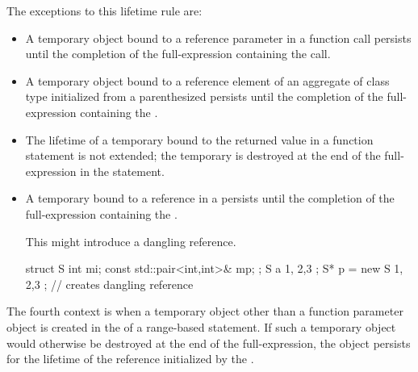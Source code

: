 The exceptions to this lifetime rule are:
\begin{itemize}
\item A temporary object bound to a reference parameter in a function call
persists until the completion of the full-expression containing the call.

\item A temporary object bound to a reference element of
an aggregate of class type initialized from
a parenthesized 
persists until the completion of the full-expression
containing the .

\item The lifetime of a temporary bound to the returned value in a function  statement is not extended; the temporary is destroyed at the end of the full-expression in the  statement.

\item A temporary bound to a reference in a  persists until the completion of the full-expression containing the .
\begin{note}
This might introduce a dangling reference.
\end{note}
\begin{example}
\begin{codeblock}
struct S { int mi; const std::pair<int,int>& mp; };
S a { 1, {2,3} };
S* p = new S{ 1, {2,3} };       // creates dangling reference
\end{codeblock}
\end{example}
\end{itemize}

\pnum
The fourth context is when a temporary object other than a function parameter object
is created in the  of a range-based  statement.
If such a temporary object would otherwise be destroyed
at the end of the  full-expression,
the object persists for the lifetime of the reference
initialized by the .

